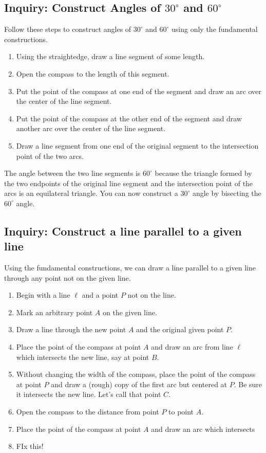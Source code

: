\documentclass[11pt]{article}
\newenvironment{task}
	{\begin{mdframed}[linecolor=lightgray, linewidth=3pt]\raggedright}
	{\end{mdframed}}
\theoremstyle{definition}
\begin{document}
\subsection{Inquiry: Construct Angles of $30^\circ$ and $60^\circ$}
\begin{task}

Follow these steps to construct angles of $30^\circ$ and $60^\circ$ using only the fundamental constructions.
\begin{enumerate}
  \item Using the straightedge, draw a line segment of some length.
  \item Open the compass to the length of this segment.
  \item Put the point of the compass at one end of the segment and draw an arc over the center of the line segment.
  \item Put the point of the compass at the other end of the segment and draw another arc over the center of the line segment.
  \item Draw a line segment from one end of the original segment to the intersection point of the two arcs.
\end{enumerate}

The angle between the two line segments is $60^\circ$ because the triangle formed by the two endpoints of the original line segment and the
intersection point of the arcs is an equilateral triangle. You can now construct a $30^\circ$ angle by bisecting the $60^\circ$ angle.
\end{task}

\subsection{Inquiry: Construct a line parallel to a given line}
\begin{task}
  Using the fundamental constructions, we can draw a line parallel to a given line through any point not on the given line.

  \begin{enumerate}
    \item Begin with a line $\ell$ and a point $P$ not on the line.
    \item Mark an arbitrary point $A$ on the given line.
    \item Draw a line through the new point $A$ and the original given point $P$.
    \item Place the point of the compass at point $A$ and draw an arc from line $\ell$ which intersects the new line, say at point $B$.
    \item Without changing the width of the compass, place the point of the compass at point $P$ and draw a (rough) copy of the first arc but centered at $P$. Be sure it intersects the new line. Let's call that point $C$.
    \item Open the compass to the distance from point $P$ to point $A$.
    \item Place the point of the compass at point $A$ and draw an arc which intersects 
    \item FIx this!
  \end{enumerate}
\end{task}
\end{document}
